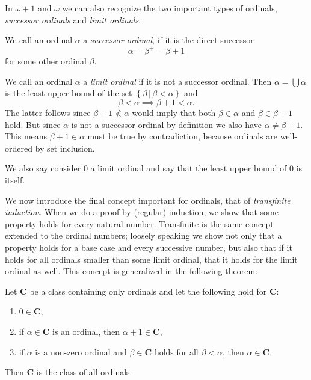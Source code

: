 \documentclass[../../main.tex]{subfiles}
\begin{document}
In $\omega + 1$ and $\omega$ we can also recognize the two important types of ordinals, \textit{successor ordinals} and \textit{limit ordinals}.

\begin{definition}\cite[p.13]{Jec78}
    We call an ordinal $\alpha$ a \textit{successor ordinal}, if it is the direct successor $$\alpha = \beta^+ = \beta + 1$$
    for some other ordinal $\beta$.
\end{definition}

\begin{definition}\cite[Exercise 2.3]{Jec78}
    We call an ordinal $\alpha$ a \textit{limit ordinal} if it is not a successor ordinal.
    Then $\alpha = \bigcup \alpha$ is the least upper bound of the set $\left\{\beta \,\vert\, \beta < \alpha\right\}$ and $$\beta < \alpha \implies \beta + 1 < \alpha.$$
    The latter follows since $\beta + 1 \not< \alpha$ would imply that both $\beta \in \alpha$ and $\beta \in \beta + 1$ hold.
    But since $\alpha$ is not a successor ordinal by definition we also have $\alpha \neq \beta + 1$.
    This means $\beta + 1 \in \alpha$ must be true by contradiction, because ordinals are well-ordered by set inclusion.

    We also say consider $0$ a limit ordinal and say that the least upper bound of $0$ is itself.
\end{definition}

We now introduce the final concept important for ordinals, that of \textit{transfinite induction}.
When we do a proof by (regular) induction, we show that some property holds for every natural number.
Transfinite is the same concept extended to the ordinal numbers; loosely speaking we show not only that a property holds for a base case and every successive number,
but also that if it holds for all ordinals smaller than some limit ordinal, that it holds for the limit ordinal as well.
This concept is generalized in the following theorem:

\begin{theorem}\cite[Theorem 3]{Jec78}
    Let $\mathbf{C}$ be a class containing only ordinals and let the following hold for $\mathbf{C}$:
    \begin{enumerate}[label=(\roman*)]
        \item $0 \in \mathbf{C}$,
        \item if $\alpha \in \mathbf{C}$ is an ordinal, then $\alpha + 1 \in \mathbf{C}$,
        \item if $\alpha$ is a non-zero ordinal and $\beta \in \mathbf{C}$ holds for all $\beta < \alpha$, then $\alpha \in \mathbf{C}$.
    \end{enumerate}
    Then $\mathbf{C}$ is the class of all ordinals.
\end{theorem}
\end{document}

